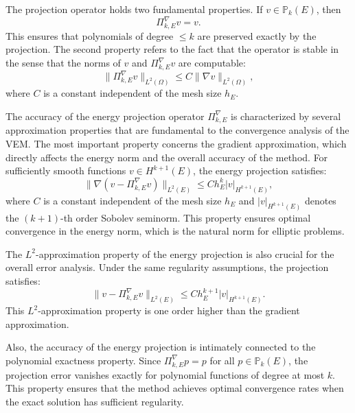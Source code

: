 \documentclass{article}
\begin{document}
The projection operator holds two fundamental properties. If $v \in \mathbb{P}_k(E)$, then
\begin{equation}
    \nonumber
    \Pi^\nabla_{k,E} v = v.
\end{equation}
This ensures that polynomials of degree $\leq k$ are preserved exactly by the projection. The second property refers to the fact that the operator is stable in the sense that the norms of $v$ and $\Pi^\nabla_{k,E} v$ are computable:
\begin{equation}
    \nonumber
    \| \Pi^\nabla_{k,E} v \|_{L^2(\Omega)} \leq C \| \nabla v \|_{L^2(\Omega)},
\end{equation}
where $C$ is a constant independent of the mesh size $h_E$.

The accuracy of the energy projection operator $\Pi^\nabla_{k,E}$ is characterized by several approximation properties that are fundamental to the convergence analysis of the VEM. The most important property concerns the gradient approximation, which directly affects the energy norm and the overall accuracy of the method. For sufficiently smooth functions $v \in H^{k+1}(E)$, the energy projection satisfies:
\begin{equation}\label{eq:energy_proj_gradient_accuracy}
    \| \nabla(v - \Pi^\nabla_{k,E} v) \|_{L^2(E)} \leq C h_E^k |v|_{H^{k+1}(E)},
\end{equation}
where $C$ is a constant independent of the mesh size $h_E$ and $|v|_{H^{k+1}(E)}$ denotes the $(k+1)$-th order Sobolev seminorm. This property ensures optimal convergence in the energy norm, which is the natural norm for elliptic problems.

The $L^2$-approximation property of the energy projection is also crucial for the overall error analysis. Under the same regularity assumptions, the projection satisfies:
\begin{equation}\label{eq:energy_proj_l2_accuracy}
    \| v - \Pi^\nabla_{k,E} v \|_{L^2(E)} \leq C h_E^{k+1} |v|_{H^{k+1}(E)}.
\end{equation}
This $L^2$-approximation property is one order higher than the gradient approximation.

Also, the accuracy of the energy projection is intimately connected to the polynomial exactness property. Since $\Pi^\nabla_{k,E} p = p$ for all $p \in \mathbb{P}_k(E)$, the projection error vanishes exactly for polynomial functions of degree at most $k$. This property ensures that the method achieves optimal convergence rates when the exact solution has sufficient regularity.
\end{document}
